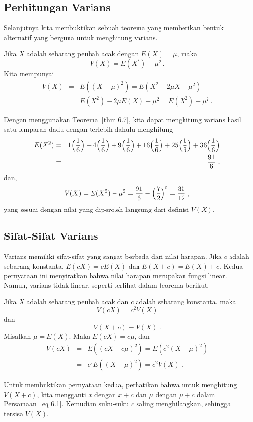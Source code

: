 \subsection*{Perhitungan Varians}

Selanjutnya kita membuktikan sebuah teorema yang memberikan bentuk alternatif yang berguna untuk menghitung
varians.

\begin{theorem}\label{thm 6.7} Jika $X$ adalah sebarang peubah acak dengan $E(X) = \mu$, maka
$$ V(X) = E(X^2) - \mu^2\ .
$$
\proof Kita mempunyai
\begin{eqnarray*} V(X) & = & E((X - \mu)^2) = E(X^2 - 2\mu X + \mu^2) \\
     & = & E(X^2) - 2\mu E(X) + \mu^2 = E(X^2) - \mu^2\ .
\end{eqnarray*}
\end{theorem}

Dengan menggunakan Teorema~\ref{thm 6.7}, kita dapat menghitung varians hasil satu lemparan
dadu dengan terlebih dahulu menghitung
\begin{eqnarray*} E(X^2) & = & 1\Bigl(\frac 16\Bigr) + 4\Bigl(\frac 16\Bigr) +
9\Bigl(\frac 16\Bigr) + 16\Bigl(\frac 16\Bigr) + 25\Bigl(\frac 16\Bigr) +
36\Bigl(\frac 16\Bigr) \\
       & = &\frac {91}6\ ,
\end{eqnarray*} dan,
$$ 
V(X)  =  E(X^2) - \mu^2 = \frac {91}{6} - \Bigl(\frac 72\Bigr)^2
 = \frac {35}{12}\ ,
$$
yang sesuai dengan nilai yang diperoleh langsung dari definisi
$V(X)$.


\subsection*{Sifat-Sifat Varians}

Varians memiliki sifat-sifat yang sangat berbeda dari nilai harapan. Jika
$c$ adalah sebarang konstanta, $E(cX) = cE(X)$ dan $E(X + c) = E(X) + c$. Kedua pernyataan ini
menyiratkan bahwa nilai harapan merupakan fungsi linear. Namun, varians tidak
linear, seperti terlihat dalam teorema berikut.

\begin{theorem}\label{thm 6.6} Jika $X$ adalah sebarang peubah acak dan $c$ adalah sebarang konstanta,
maka
$$ V(cX)  = c^2 V(X)
$$ dan
$$ V(X + c) = V(X)\ .
$$
\proof Misalkan $\mu = E(X)$. Maka $E(cX) = c\mu$, dan
\begin{eqnarray*} V(cX) &=& E((cX - c\mu)^2) = E(c^2(X - \mu)^2) \\
      &=& c^2 E((X - \mu)^2) = c^2 V(X)\ .
\end{eqnarray*}

Untuk membuktikan pernyataan kedua, perhatikan bahwa untuk menghitung $V(X + c)$, kita mengganti
$x$ dengan $x + c$ dan $\mu$ dengan $\mu + c$ dalam Persamaan~\ref{eq 6.1}. Kemudian suku-suku
$c$ saling menghilangkan, sehingga tersisa $V(X)$.
\end{theorem}

